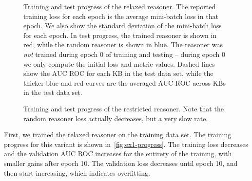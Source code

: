 \begin{figure}
\centering
\caption{
Training and test progress of the relaxed reasoner.
The reported training loss for each epoch is the average mini-batch loss in that epoch.
We also show the standard deviation of the mini-batch loss for each epoch.
In test progress, the trained reasoner is shown in red, while the random reasoner is shown in blue.
The reasoner was \emph{not} trained during epoch 0 of training and testing -- during epoch 0 we only compute the initial loss and metric values.
Dashed lines show the AUC ROC for each KB in the test data set, while the thicker blue and red curves are the averaged AUC ROC across KBs in the test data set.
}
\label{fig:ex1-progress}
\end{figure}

\begin{figure}
\centering
\caption{
Training and test progress of the restricted reasoner.
Note that the random reasoner loss actually decreases, but a very slow rate.
}
\label{fig:ex2-progress}
\end{figure}

First, we trained the relaxed reasoner on the training data set.
The training progress for this variant is shown in~\autoref{fig:ex1-progress}.
The training loss decreases and the validation AUC ROC increases for the entirety of the training, with smaller gains after epoch 10.
The validation loss decreases until epoch 10, and then start increasing, which indicates overfitting.

